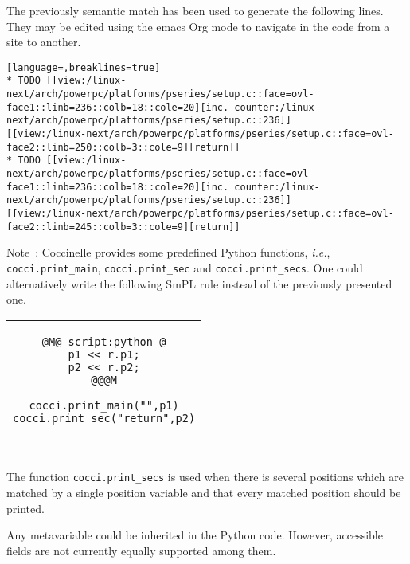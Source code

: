 The previously semantic match has been used to generate the following
lines. They may be edited using the emacs Org mode to navigate in the code
from a site to another.

\begin{lstlisting}[language=,breaklines=true]
* TODO [[view:/linux-next/arch/powerpc/platforms/pseries/setup.c::face=ovl-face1::linb=236::colb=18::cole=20][inc. counter:/linux-next/arch/powerpc/platforms/pseries/setup.c::236]]
[[view:/linux-next/arch/powerpc/platforms/pseries/setup.c::face=ovl-face2::linb=250::colb=3::cole=9][return]]
* TODO [[view:/linux-next/arch/powerpc/platforms/pseries/setup.c::face=ovl-face1::linb=236::colb=18::cole=20][inc. counter:/linux-next/arch/powerpc/platforms/pseries/setup.c::236]]
[[view:/linux-next/arch/powerpc/platforms/pseries/setup.c::face=ovl-face2::linb=245::colb=3::cole=9][return]]
\end{lstlisting}

Note~: Coccinelle provides some predefined Python functions,
\emph{i.e.}, \texttt{cocci.print\_main}, \texttt{cocci.print\_sec} and
\texttt{cocci.print\_secs}. One could alternatively write the following
SmPL rule instead of the previously presented one.

\begin{tabular}{c}
\begin{lstlisting}[language=Cocci]
@M@ script:python @
p1 << r.p1;
p2 << r.p2;
@@@M

cocci.print_main("",p1)
cocci.print_sec("return",p2)
\end{lstlisting}
\end{tabular}\\

The function \texttt{cocci.print\_secs} is used when there is several
positions which are matched by a single position variable and that
every matched position should be printed.

Any metavariable could be inherited in the Python code. However,
accessible fields are not currently equally supported among them.


